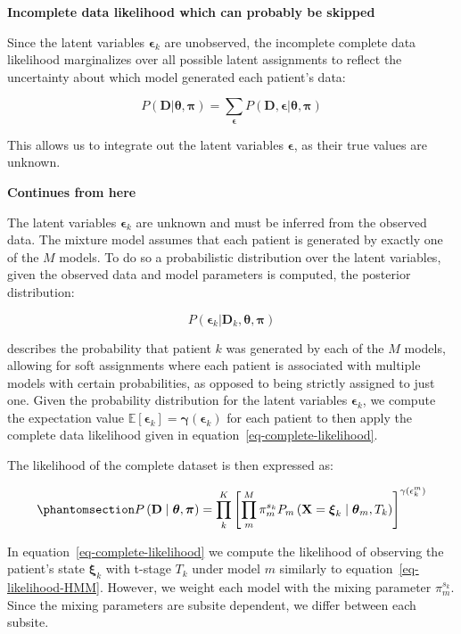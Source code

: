 \documentclass[
  sn-mathphys-num,
]{sn-jnl}
\begin{document}
\textbf{Incomplete data likelihood which can probably be skipped}

Since the latent variables \(\boldsymbol{\epsilon}_k\) are unobserved,
the incomplete complete data likelihood marginalizes over all possible
latent assignments to reflect the uncertainty about which model
generated each patient's data:

\[
P(\mathbf{D} | \boldsymbol{\theta}, \boldsymbol{\pi}) = \sum_{\boldsymbol{\epsilon}} P(\mathbf{D}, \boldsymbol{\epsilon} | \boldsymbol{\theta}, \boldsymbol{\pi})
\]

This allows us to integrate out the latent variables
\(\boldsymbol{\epsilon}\), as their true values are unknown.

\textbf{Continues from here}

The latent variables \(\boldsymbol{\epsilon}_k\) are unknown and must be
inferred from the observed data. The mixture model assumes that each
patient is generated by exactly one of the \(M\) models. To do so a
probabilistic distribution over the latent variables, given the observed
data and model parameters is computed, the posterior distribution:

\[
P(\boldsymbol{\epsilon}_k | \mathbf{D}_k, \boldsymbol{\theta}, \boldsymbol{\pi})
\]

describes the probability that patient \(k\) was generated by each of
the \(M\) models, allowing for soft assignments where each patient is
associated with multiple models with certain probabilities, as opposed
to being strictly assigned to just one. Given the probability
distribution for the latent variables \(\boldsymbol{\epsilon}_k\), we
compute the expectation value
\(\mathbb{E}[\boldsymbol{\epsilon}_k] = \boldsymbol{\gamma}(\boldsymbol{\epsilon}_k)\)
for each patient to then apply the complete data likelihood given in
equation~\ref{eq-complete-likelihood}.

The likelihood of the complete dataset is then expressed as:

\begin{equation}\phantomsection\label{eq-complete-likelihood-explicite}{
P \left( \mathbf{D} \mid \boldsymbol{\theta}, \boldsymbol{\pi}\right) = \prod_k^K \left[ \prod_{m}^M \pi_m^{s_k} P_m \left( \mathbf{X}=\boldsymbol{\xi}_k \mid \boldsymbol{\theta}_m, T_k \right) \right]^{\gamma(\epsilon_k^m)} 
}\end{equation}

In equation~\ref{eq-complete-likelihood} we compute the likelihood of
observing the patient's state \(\boldsymbol{\xi}_k\) with t-stage
\(T_k\) under model \(m\) similarly to equation~\ref{eq-likelihood-HMM}.
However, we weight each model with the mixing parameter \(\pi_m^{s_k}\).
Since the mixing parameters are subsite dependent, we differ between
each subsite.
\end{document}
